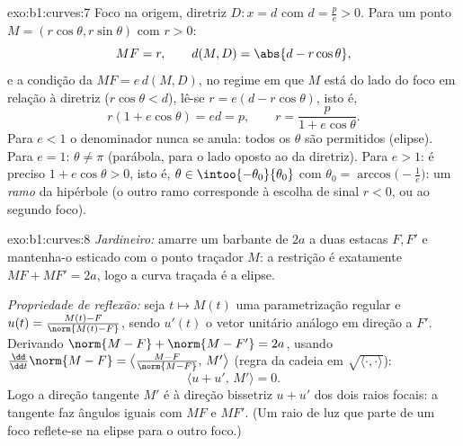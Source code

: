 \begin{solution}{exo:b1:curves:7}
Foco na origem, diretriz $D: x = d$ com $d = \frac pe > 0$. Para um ponto $M = (r\cos\theta, r\sin\theta)$ com
$r > 0$:
\[
MF = r,
\qquad
d(M, D) = \abs{d - r\cos\theta},
\]
e a condição da  $MF = e\,d(M, D)$, no regime em que $M$ está do lado do
foco em relação à diretriz ($r\cos\theta < d$), lê-se $r
= e(d - r\cos\theta)$, isto é,
\[
r(1 + e\cos\theta) = ed = p,
\qquad
r = \frac{p}{1 + e\cos\theta} .
\]
Para $e < 1$ o denominador nunca se anula: todos os $\theta$ são
permitidos (elipse). Para $e = 1$: $\theta \neq \pi$ (parábola,  para o
lado oposto ao da diretriz). Para $e > 1$: é preciso $1 + e\cos\theta > 0$, isto é,
$\theta \in \intoo{-\theta_0}{\theta_0}$ com $\theta_0 =
\arccos\bigl(-\frac1e\bigr)$: um \emph{ramo} da hipérbole (o outro ramo
corresponde à escolha de sinal $r < 0$, ou ao segundo foco).
\end{solution}

\begin{solution}{exo:b1:curves:8}
\emph{Jardineiro:} amarre um barbante de  $2a$ a duas
estacas $F, F'$ e mantenha-o esticado com o ponto traçador $M$: a
restrição é exatamente $MF + MF' = 2a$, logo a curva traçada é a elipse.

\emph{Propriedade de reflexão:} seja $t \mapsto M(t)$ uma parametrização regular
e $u(t) = \frac{M(t) - F}{\norm{M(t) - F}}$, sendo $u'(t)$ o vetor unitário análogo em direção a $F'$.
Derivando $\norm{M - F} + \norm{M - F'} = 2a$, usando $\frac{\dd}{\dd
t}\norm{M - F} = \bigl\langle \frac{M - F}{\norm{M-F}},\,
M'\bigr\rangle$ (regra da cadeia em $\sqrt{\langle\cdot,\cdot\rangle}$):
\[
\bigl\langle u + u',\, M'\bigr\rangle = 0 .
\]
Logo a direção tangente $M'$ é  à direção bissetriz $u + u'$
dos dois raios focais: a tangente faz ângulos iguais com $MF$ e
$MF'$. (Um raio de luz que parte de um foco reflete-se na elipse para
o outro foco.)
\end{solution}

